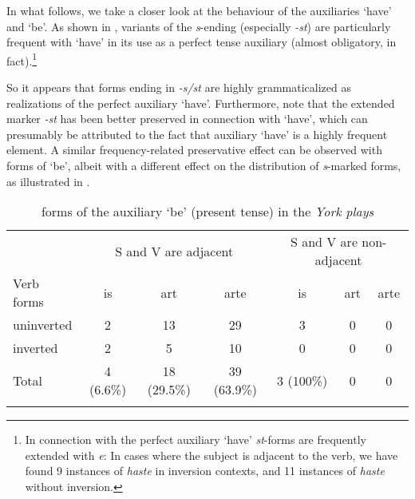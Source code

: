 \documentclass[output=paper]{langsci/langscibook}
\begin{document}
In what follows, we take a closer look at the behaviour of the auxiliaries
`have' and `be'. As shown in , variants of the
\emph{s}-ending (especially \emph{-st}) are particularly frequent with `have’
in its use as a perfect tense auxiliary (almost obligatory, in
fact).\footnote{In connection with the perfect auxiliary ‘have'
    \Ssg{} \emph{st}-forms are frequently extended with \emph{e}: In cases
    where the subject is adjacent to the verb, we have found 9 instances of
\emph{haste} in inversion contexts, and 11 instances of \emph{haste} without
inversion.}

\begin{table}
\caption{Verbal endings of the second person perfect auxiliary `have' in the \emph{York plays}\label{table1-2ndps-have}}
\end{table}

So it appears that forms ending in \emph{-s/st} are highly grammaticalized as
realizations of the \Ssg{} perfect auxiliary `have'. Furthermore, note that the
extended \Ssg{} marker \emph{-st} has been better preserved in connection
with `have', which can presumably be attributed to the fact that auxiliary
`have' is a highly frequent element. A similar frequency-related preservative
effect can be observed with \Ssg{} forms of `be', albeit with a different
effect on the distribution of \emph{s}-marked forms, as illustrated in .

\begin{table}
  \begin{tabular}{lcccccc}
  \lsptoprule
& \multicolumn{3}{c}{S and V are adjacent} & \multicolumn{3}{c}{S and V are non-adjacent}\\\cmidrule(lr){2-4}\cmidrule(lr){5-7}
Verb forms  & is & art & arte & is & art & arte\\
uninverted & 2 & 13 & 29 & 3 & 0 & 0\\
inverted & 2 & 5 & 10 & 0  & 0 & 0\\\midrule
Total & 4 (6.6\%) & 18 (29.5\%) & 39 (63.9\%) & 3 (100\%) & 0 & 0\\
  \lspbottomrule
  \end{tabular}
\caption{\Ssg{} forms of the auxiliary `be' (present tense) in the \emph{York
plays}\label{table1-2ndps-be}}
\end{table}
\end{document}
